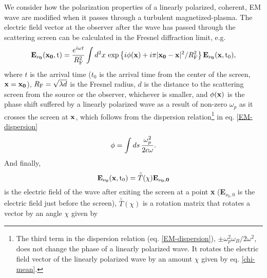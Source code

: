 \documentclass[fleqn,usenatbib]{mnras}
\begin{document}
	We consider how the polarization properties of a linearly polarized, coherent, EM wave are modified when it passes through a turbulent magnetized-plasma. The electric field vector at the observer after the wave has passed through the scattering screen can be calculated in the Fresnel diffraction limit, e.g. \cite{Narayan1992}
	\begin{equation}
		\label{eq:E_nu(x_0,t)}
		{\bf E_{\nu_0}(x_0, \rm t)} = {e^{i\omega t}\over R_{\rm F}^2} \int d^2x\, \exp\left\{{i\phi({\bf x}) + i\pi |{\bf x_0 - x}|^2/R_{\rm F}^2}\right\} {\bf E_{\nu_0}(x, \rm t_0)},
	\end{equation}
	where $t$ is the arrival time ($t_0$ is the arrival time from the center of the screen, ${\bf x}={\bf x_0}$), $R_{\rm F}=\sqrt{\lambda d}$ is the Fresnel radius, $d$ is the distance to the scattering screen from the source or the observer, whichever is smaller, and $\phi({\bf x})$ is the phase shift suffered by a linearly polarized wave as a result of non-zero $\omega_p$ as it crosses the screen at ${\bf x}$, which follows from the dispersion relation\footnote{The third term in the dispersion relation (eq. \ref{EM-dispersion}), $\pm\omega_p^2\omega_B/2\omega^2$, does not change the phase of a linearly polarized wave. It rotates the electric field vector of the linearly polarized wave by an amount $\chi$ given by eq. \ref{chi-mean}.} in eq. \ref{EM-dispersion}
	\begin{equation}
		\phi = \int ds \, {\omega_p^2\over 2c\omega}.
	\end{equation}
	And finally,
	\begin{equation}
		{\bf E_{\nu_0}(x, \rm t_0)} = {\bar{\bar T}}(\chi) {\bf E_{\nu_0,0}}
	\end{equation}
	is the electric field of the wave after exiting the screen at a point {\bf x} ({\bf E}$_{\nu_0,0}$ is the electric field just before the screen), ${\bar{\bar T}}(\chi)$ is a rotation matrix that rotates a vector by an angle $\chi$ given by
	
\end{document}
